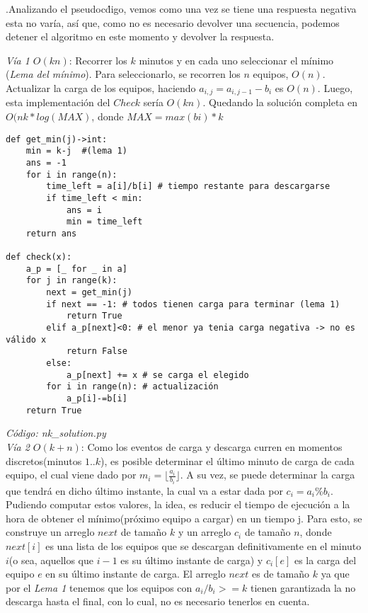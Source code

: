 \documentclass{article}
\begin{document}
 .Analizando el pseudoc\'digo, vemos como una vez se tiene una respuesta negativa esta no var\'ia, as\'i que, como no es necesario devolver una secuencia, podemos detener el algoritmo en este momento y devolver la respuesta. 
 
\textit{V\'ia 1 $O(kn)$}: Recorrer los $k$ minutos y en cada uno seleccionar el m\'inimo (\textit{Lema del m\'inimo}). Para seleccionarlo, se recorren los $n$ equipos, $O(n)$. Actualizar la carga de los equipos, haciendo $a_{i,j} = a_{i,j-1} - b_i$  es $O(n)$. Luego, esta implementaci\'on del $Check$ ser\'ia $O(kn)$. Quedando la soluci\'on completa en $O(nk*log(MAX)$, donde $MAX=max(bi)*k$ \\

\begin{verbatim}
def get_min(j)->int:
    min = k-j  #(lema 1)
    ans = -1
    for i in range(n):
        time_left = a[i]/b[i] # tiempo restante para descargarse
        if time_left < min:
            ans = i
            min = time_left
    return ans

def check(x):
    a_p = [_ for _ in a] 
    for j in range(k):
        next = get_min(j)
        if next == -1: # todos tienen carga para terminar (lema 1)
            return True
        elif a_p[next]<0: # el menor ya tenia carga negativa -> no es válido x
            return False
        else:
            a_p[next] += x # se carga el elegido
        for i in range(n): # actualización
            a_p[i]-=b[i]
    return True
\end{verbatim}
\textit{C\'odigo: nk\_solution.py}\\

\textit{V\'ia 2 $O(k+n)$}: Como los eventos de carga y descarga curren en momentos discretos(minutos $1..k$), es posible determinar el \'ultimo minuto de carga de cada equipo, el cual viene dado por $m_i = \lfloor \frac{a_i}{b_i} \rfloor $. A su vez, se puede determinar la carga que tendr\'a en dicho \'ultimo instante, la cual va a estar dada por $c_i=a_i\%b_i$. Pudiendo computar estos valores, la idea, es reducir el tiempo de ejecuci\'on a la hora de obtener el m\'inimo(pr\'oximo equipo a cargar) en un tiempo j. Para esto, se construye un arreglo $next$ de tama\~no $k$ y un arreglo $c_i$ de tama\~no $n$, donde $next[i]$ es una lista de los equipos que se descargan definitivamente en el minuto $i$(o sea, aquellos que $i-1$ es su \'ultimo instante de carga) y $c_i[e]$ es la carga del equipo $e$ en su \'ultimo instante de carga. El arreglo $next$ es de tama\~no $k$ ya que por el \textit{Lema 1} tenemos que los equipos con $a_i/b_i >= k$ tienen garantizada la no descarga hasta el final, con lo cual, no es necesario tenerlos en cuenta. \\
\end{document}
